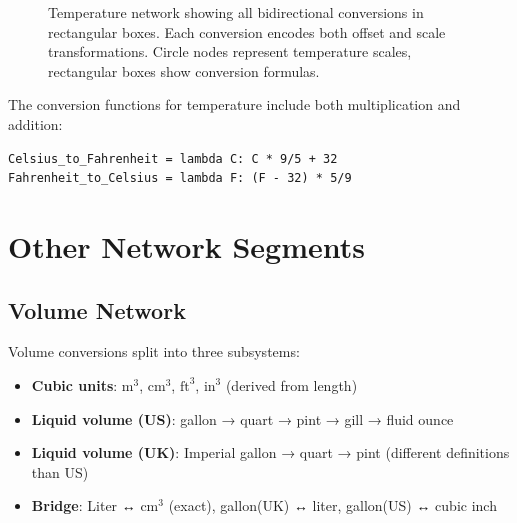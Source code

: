 \documentclass[11pt,a4paper]{report}
\begin{document}
\begin{figure}[h]
\centering
{}
\caption{Temperature network showing all bidirectional conversions in rectangular boxes. Each conversion encodes both offset and scale transformations. Circle nodes represent temperature scales, rectangular boxes show conversion formulas.}
\label{fig:temperature_network}
\end{figure}

The conversion functions for temperature include both multiplication and addition:
\begin{lstlisting}[style=pythonstyle, caption={Temperature conversion example}]
Celsius_to_Fahrenheit = lambda C: C * 9/5 + 32
Fahrenheit_to_Celsius = lambda F: (F - 32) * 5/9
\end{lstlisting}

\section{Other Network Segments}

\subsection{Volume Network}

Volume conversions split into three subsystems:
\begin{itemize}[leftmargin=*]
  \item \textbf{Cubic units}: $\text{m}^3$, $\text{cm}^3$, $\text{ft}^3$, $\text{in}^3$ (derived from length)
  \item \textbf{Liquid volume (US)}: gallon → quart → pint → gill → fluid ounce
  \item \textbf{Liquid volume (UK)}: Imperial gallon → quart → pint (different definitions than US)
  \item \textbf{Bridge}: Liter ↔ $\text{cm}^3$ (exact), gallon(UK) ↔ liter, gallon(US) ↔ cubic inch
\end{itemize}
\end{document}
